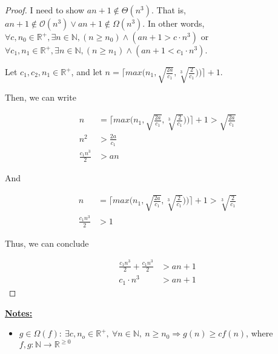 \documentclass[12pt]{article}
\begin{document}
\begin{enumerate}[1.]
\begin{proof}
        \bigskip

        I need to show $an+1 \notin \Theta(n^3)$. That is, $an + 1 \notin \mathcal{O}(n^3) \lor an+1 \notin \Omega(n^3)$.
        In other words, $\forall c, n_0 \in \mathbb{R}^+, \exists n \in \mathbb{N}, (n \geq n_0) \land (an+1 > c \cdot n^3)$ or
        $\forall c_1, n_1 \in \mathbb{R}^+, \exists n \in \mathbb{N}, (n \geq n_1) \land (an+1 < c_1 \cdot n^3)$.

        \bigskip

        Let $c_1, c_2, n_1 \in \mathbb{R}^+$, and let $n = \bigl\lceil max\bigl( n_1, \sqrt{\frac{2a}{c_1}}, \sqrt[3]{\frac{2}{c_1}}) \bigr) \bigr\rceil + 1$.

        \bigskip

        Then, we can write

        \begin{align}
            n &= \bigl\lceil max\bigl( n_1, \sqrt{\frac{2a}{c_1}}, \sqrt[3]{\frac{2}{c_1}}) \bigr) \bigr\rceil + 1 > \sqrt{\frac{2a}{c_1}}\\
            n^2 &> \frac{2a}{c_1}\\
            \frac{c_1 n^3}{2} &> an
        \end{align}

        \bigskip

        And

        \begin{align}
            n &= \bigl\lceil max\bigl( n_1, \sqrt{\frac{2a}{c_1}}, \sqrt[3]{\frac{2}{c_1}}) \bigr) \bigr\rceil + 1 > \sqrt[3]{\frac{2}{c_1}}\\
            \frac{c_1n^3}{2} &> 1
        \end{align}

        \bigskip

        Thus, we can conclude

        \begin{align}
            \frac{c_1n^3}{2} + \frac{c_1n^3}{2} &> an + 1\\
            c_1 \cdot n^3 &> an + 1
        \end{align}
    \end{proof}

    \bigskip

    \underline{\textbf{Notes:}}

    \bigskip

    \begin{itemize}
        \item
        $g \in \Omega(f):\:\exists c,n_o \in \mathbb{R}^{+},\:\forall n \in
        \mathbb{N},\:n \geq n_0 \Rightarrow g(n) \geq cf(n)$, where $f,g:\mathbb{N} \to \mathbb{R}^{\geq 0}$


\end{itemize}
\end{enumerate}
\end{document}
